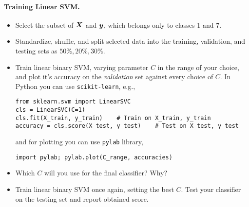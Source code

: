 \documentclass{article}
\begin{document}
\paragraph{Training Linear \ac{SVM}.}
\begin{itemize}
\item Select the subset of $\boldsymbol{X}$ and $\boldsymbol{y}$, which belongs only to classes $1$ and $7$.
\item Standardize, shuffle, and split selected data into the training, validation, and testing sets as $50\%, 20\%, 30\%$.
\item Train linear binary \ac{SVM}, varying parameter $C$ in the range of your choice, and plot it's accuracy on the \emph{validation} set against every choice of $C$.
In Python you can use \verb!scikit-learn!, e.g.,
\begin{lstlisting}
from sklearn.svm import LinearSVC
cls = LinearSVC(C=1)
cls.fit(X_train, y_train)    # Train on X_train, y_train
accuracy = cls.score(X_test, y_test)    # Test on X_test, y_test
\end{lstlisting}
and for plotting you can use \verb!pylab! library,
\begin{lstlisting}
import pylab; pylab.plot(C_range, accuracies)
\end{lstlisting}
\item Which $C$ will you use for the final classifier? Why?
\item Train linear binary \ac{SVM} once again, setting the best $C$. Test your classifier on the testing set and report obtained score.
\end{itemize}
\end{document}
